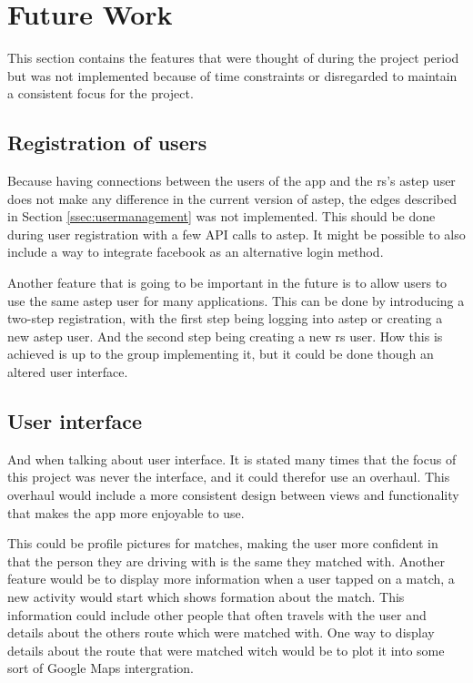 \section{Future Work}\label{sec:future}
This section contains the features that were thought of during the project period but was not implemented because of time constraints or disregarded to maintain a consistent focus for the project.

\subsection{Registration of users}
Because having connections between the users of the app and the \gls{rs}'s \gls{astep} user does not make any difference in the current version of \gls{astep}, the edges described in Section \ref{ssec:usermanagement} was not implemented.
This should be done during user registration with a few API calls to \gls{astep}.
It might be possible to also include a way to integrate  facebook as an alternative login method.

Another feature that is going to be important in the future is to allow users to use the same \gls{astep} user for many applications.
This can be done by introducing a two-step registration, with the first step being logging into \gls{astep} or creating a new \gls{astep} user.
And the second step being creating a new \gls{rs} user.
How this is achieved is up to the group implementing it, but it could be done though an altered user interface.

\subsection{User interface}
And when talking about user interface.
It is stated many times that the focus of this project was never the interface, and it could therefor use an overhaul.
This overhaul would include a more consistent design between views and functionality that makes the app more enjoyable to use.

This could be profile pictures for matches, making the user more confident in that the person they are driving with is the same they matched with.
Another feature would be to display more information when a user tapped on a match, a new activity would start which shows formation about the match.
This information could include other people that often travels with the user and details about the others route which were matched with.
One way to display details about the route that were matched witch would be to plot it into some sort of Google Maps intergration.

